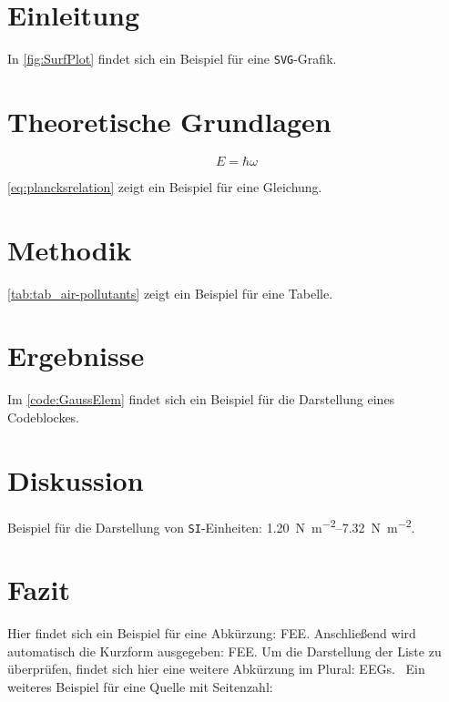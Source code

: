 \section{Einleitung}

\lipsum[24]



In \autoref{fig:SurfPlot} findet sich ein Beispiel für eine \texttt{SVG}-Grafik. \lipsum[13]

\section{Theoretische Grundlagen}

\lipsum[32]

\begin{equation}
	E = \hbar \omega
	\label{eq:plancksrelation}
\end{equation}

\autoref{eq:plancksrelation} zeigt ein Beispiel für eine Gleichung. \lipsum

\section{Methodik}

\lipsum[27]

%

\autoref{tab:tab_air-pollutants} zeigt ein Beispiel für eine Tabelle. \lipsum

\section{Ergebnisse}

\lipsum[14]



Im \autoref{code:GaussElem} findet sich ein Beispiel für die Darstellung eines Codeblockes. \lipsum

\section{Diskussion}

\lipsum[18] Beispiel für die Darstellung von \texttt{SI}-Einheiten: \SIrange{1.20}{7.32}{\newton\per\square\meter}. \lipsum

\section{Fazit}

Hier findet sich ein Beispiel für eine Abkürzung: \gls{FEE}. Anschließend wird automatisch die Kurzform ausgegeben: \gls{FEE}. Um die Darstellung der Liste zu überprüfen, findet sich hier eine weitere Abkürzung im Plural: \glspl{EEG}. \lipsum~Ein weiteres Beispiel für eine Quelle mit Seitenzahl: \cite[][vgl. S. 12]{WIKUE2006}